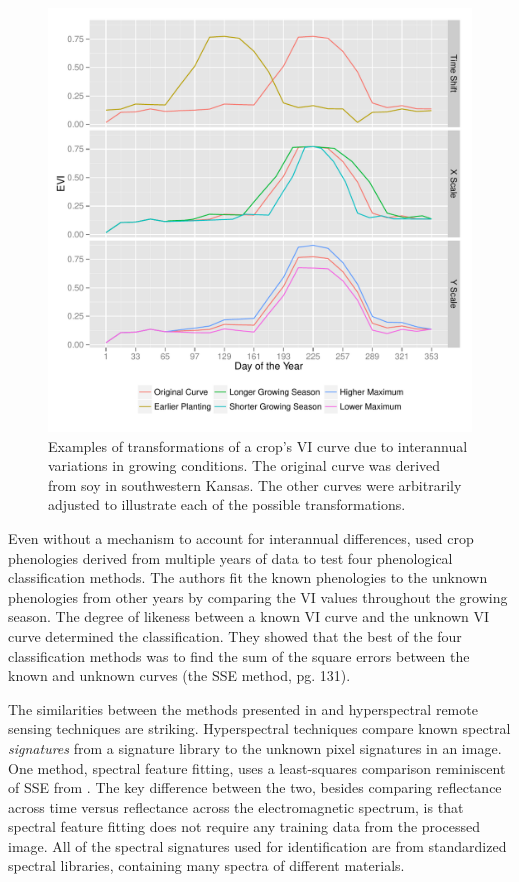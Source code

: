 \begin{figure}
  \centering
  \includegraphics[width=\textwidth]{Graphics/transformations.pdf}
  \caption{Examples of transformations of a crop's VI curve due to interannual variations in growing conditions. The original curve was derived from soy in southwestern Kansas. The other curves were arbitrarily adjusted to illustrate each of the possible transformations.}
  \label{fig:transformations}
\end{figure}

Even without a mechanism to account for interannual differences, \textcite{brown2007multitemporal} used crop phenologies derived from multiple years of data to test four phenological classification methods. The authors fit the known phenologies to the unknown phenologies from other years by comparing the VI values throughout the growing season. The degree of likeness between a known VI curve and the unknown VI curve determined the classification. They showed that the best of the four classification methods was to find the sum of the square errors between the known and unknown curves (the SSE method, pg. 131).

The similarities between the methods presented in \citeauthor{brown2007multitemporal} and hyperspectral remote sensing techniques are striking. Hyperspectral techniques compare known spectral \textit{signatures} from a signature library to the unknown pixel signatures in an image. One method, spectral feature fitting, uses a least-squares comparison reminiscent of SSE from\citeauthor{brown2007multitemporal} \autocites{solutions2013selected}{clark2003imaging}. The key difference between the two, besides comparing reflectance across time versus reflectance across the electromagnetic spectrum, is that spectral feature fitting does not require any training data from the processed image. All of the spectral signatures used for identification are from standardized spectral libraries, containing many spectra of different materials.

